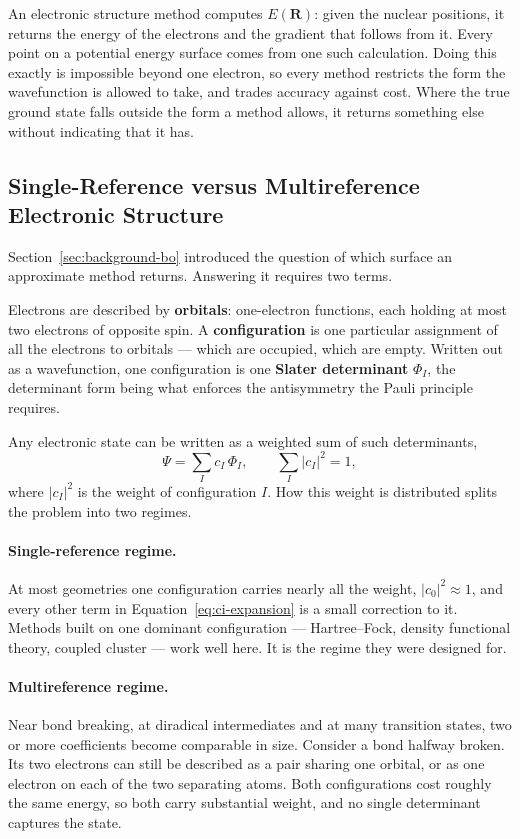 An electronic structure method computes $E(\mathbf{R})$: given the nuclear
positions, it returns the energy of the electrons and the gradient that follows
from it. Every point on a potential energy surface comes from one such
calculation. Doing this exactly is impossible beyond one electron, so every method
restricts the form the wavefunction is allowed to take, and trades accuracy
against cost. Where the true ground state falls outside the form a method allows,
it returns something else without indicating that it has.

\subsection{Single-Reference versus Multireference Electronic Structure}
\label{sec:sr-vs-mr}

Section~\ref{sec:background-bo} introduced the question of which surface an
approximate method returns. Answering it requires two terms.

Electrons are described by \textbf{orbitals}: one-electron functions, each holding
at most two electrons of opposite spin. A \textbf{configuration} is one particular
assignment of all the electrons to orbitals --- which are occupied, which are
empty. Written out as a wavefunction, one configuration is one \textbf{Slater
determinant} $\Phi_I$, the determinant form being what enforces the antisymmetry
the Pauli principle requires.

Any electronic state can be written as a weighted sum of such determinants,
%
\begin{equation}
  \Psi = \sum_I c_I \, \Phi_I ,
  \qquad \sum_I |c_I|^2 = 1 ,
  \label{eq:ci-expansion}
\end{equation}
%
where $|c_I|^2$ is the weight of configuration $I$. How this weight is distributed
splits the problem into two regimes.

\paragraph{Single-reference regime.}
At most geometries one configuration carries nearly all the weight,
$|c_0|^2 \approx 1$, and every other term in Equation~\ref{eq:ci-expansion} is a
small correction to it. Methods built on one dominant configuration ---
Hartree--Fock, density functional theory, coupled cluster --- work well here. It is
the regime they were designed for.

\paragraph{Multireference regime.}
Near bond breaking, at diradical intermediates and at many transition states, two
or more coefficients become comparable in size. Consider a bond halfway broken.
Its two electrons can still be described as a pair sharing one orbital, or as one
electron on each of the two separating atoms. Both configurations cost roughly the
same energy, so both carry substantial weight, and no single determinant captures
the state.

